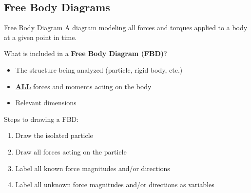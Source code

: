 \documentclass[12pt]{article}
\begin{document}
\subsection{Free Body Diagrams}
\label{ssec:freeBodyDiagrams}

\begin{definition}{Free Body Diagram}
  A diagram modeling all forces and torques applied to a body at a given point in time.
\end{definition}

What is included in a \textbf{Free Body Diagram (FBD)}?
\begin{itemize}
  \itemsep0em
  \item The structure being analyzed (particle, rigid body, etc.)
  \item \textbf{\uline{ALL}} forces and moments acting on the body
  \item Relevant dimensions
\end{itemize}

Steps to drawing a FBD:
\begin{enumerate}
  \itemsep0em
  \item Draw the isolated particle
  \item Draw all forces acting on the particle
  \item Label all known force magnitudes and/or directions
  \item Label all unknown force magnitudes and/or directions as variables
\end{enumerate}
\end{document}
